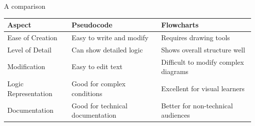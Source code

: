\documentclass[aspectratio=169]{beamer}
\begin{document}
\begin{frame}{A comparison}

\small
\begin{table}[h]
\centering
\renewcommand{\arraystretch}{1.5} %
\begin{tabular}{|l|l|l|}
\hline
\textbf{Aspect} & \textbf{Pseudocode} & \textbf{Flowcharts} \\ \hline
Ease of Creation & Easy to write and modify & Requires drawing tools \\ \hline
Level of Detail & Can show detailed logic & Shows overall structure well \\ \hline
Modification & Easy to edit text & Difficult to modify complex diagrams \\ \hline
Logic Representation & Good for complex conditions & Excellent for visual learners \\ \hline
Documentation & Good for technical documentation & Better for non-technical audiences \\ \hline
\end{tabular}
\end{table}
\end{frame}
\end{document}
